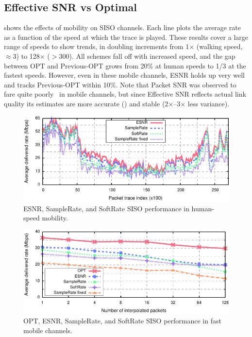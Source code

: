 \subsection{Effective SNR vs Optimal}
 shows the effects of mobility on SISO channels. Each line plots the average rate as a function of the speed at which the trace is played. These results cover a large range of speeds to show trends, in doubling increments from 1$\times$ (walking speed, $\approx$3\mph) to 128$\times$ ($>$300\mph). All schemes fall off with increased speed, and the gap between OPT and Previous-OPT grows from 20\% at human speeds to 1/3 at the fastest speeds. However, even in these mobile channels, ESNR holds up very well and tracks Previous-OPT within 10\%.
Note that Packet SNR was observed to fare quite poorly~\cite{Vutukuru_SoftRate} in mobile channels, but since Effective SNR reflects actual link quality its estimates are more accurate () and stable (2$\times$--3$\times$ less variance).

\begin{figure}[t]
      \centering
      \includegraphics[width=\textwidth]{figures/rate/siso_rate_time_opt_eff_sr_so.pdf}
      \caption{\label{fig:siso_rate_time_opt_eff_sr_so} ESNR, SampleRate, and SoftRate SISO performance in human-speed mobility.}
\end{figure}
\begin{figure}[t]
      \centering
      \includegraphics[width=\textwidth]{figures/rate/siso_rate_skip_opt_eff_sr_so.pdf}
      \caption{\label{fig:siso_rate_skip_opt_eff_sr_so} OPT, ESNR, SampleRate, and SoftRate SISO performance in fast mobile channels.}
\end{figure}


